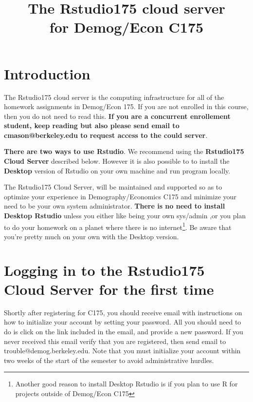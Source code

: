 \documentclass[11pt]{article}
\begin{document}
\title{The Rstudio175 cloud server\\
for Demog/Econ C175}

\maketitle
\tableofcontents

\section{Introduction}

The Rstudio175 cloud server is the computing infrastructure for all of the homework assignments in Demog/Econ 175. If you are not enrolled in this course, then you do not need to read this.  \textbf{If you are a concurrent enrollement student, keep reading but also please send email to cmason@berkeley.edu to request access to the could server}.

\begin{mdframed}[backgroundcolor=blue!20]        
\textbf{There are two ways to use Rstudio}. We recommend using the \textbf{Rstudio175 Cloud Server} described below. However it is also possible to  to install the \textbf{Desktop} version of  Rstudio on your own machine and run program locally.

The Rstudio175 Cloud Server, will be maintained and supported so as to optimize your experience in Demography/Economics C175 and minimize your need to be your own system administrator.  \textbf{There is no need to install Desktop Rstudio} unless you either like  being your own sys/admin ,or you plan to do your homework on a planet where there is no internet\footnote{Another good reason to install Desktop Rstudio is if you plan to use R for projects outside of Demog/Econ C175}. Be aware that you're pretty much on your own with the Desktop version.  
\end{mdframed}
\section{Logging in to the Rstudio175 Cloud Server for the first time}

Shortly after registering for C175, you should receive email with instructions on how to initialize your account by setting your password.  All you should need to do is click on the link included in the email, and provide a new password.  If you never received this email verify that you are registered, then send email to trouble@demog.berkeley.edu.  Note that you must initialize your account within two weeks of the start of the semester to avoid administrative hurdles.
\end{document}
